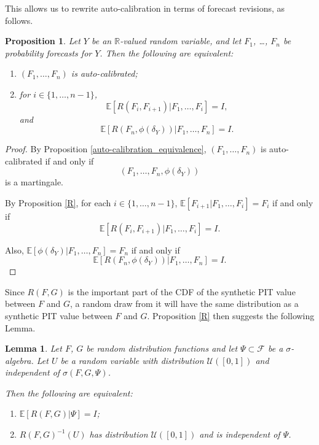 \documentclass[aap]{imsart}
\theoremstyle{plain}
\newtheorem{proposition}[theorem]{Proposition}
\newtheorem{lemma}[theorem]{Lemma}
\theoremstyle{definition}
\begin{document}
This allows us to rewrite auto-calibration in terms of forecast revisions, as follows.
\begin{proposition}\label{auto-calibrated_revisions}
  Let $Y$ be an $\mathbb{R}$-valued random variable, and let $F_1$, \ldots, $F_n$ be probability forecasts for $Y$. Then the following are equivalent:
\begin{enumerate}[label=(\roman*)]
\item $(F_1, \ldots, F_n)$ is auto-calibrated;
\item for $i \in \{1, \ldots, n-1\}$, 
\begin{equation*}
\mathbb{E}[R(F_i, F_{i+1})|F_1, \ldots, F_i] = I,
\end{equation*}
and 
\begin{equation*}
\mathbb{E}[R(F_n, \phi(\delta_Y))|F_1, \ldots, F_n] = I.
\end{equation*}
\end{enumerate}
\end{proposition}

\begin{proof}
  By Proposition \ref{auto-calibration_equivalence}, $(F_1, \ldots, F_n)$ is auto-calibrated if and only if
\begin{equation*}
  (F_1, \ldots, F_n, \phi(\delta_Y))
\end{equation*}
is a martingale.

  By Proposition \ref{R}, for each $i \in \{1, \ldots, n-1\}$, $\mathbb{E}[F_{i+1}|F_1, \ldots, F_i] = F_i$ if and only if \begin{equation*}
\mathbb{E}[R(F_i, F_{i+1})|F_1, \ldots, F_i] = I.
\end{equation*}

  Also, $\mathbb{E}[\phi(\delta_Y)|F_1, \ldots, F_n] = F_n$ if and only if
\begin{equation*}
\mathbb{E}[R(F_n, \phi(\delta_Y))|F_1, \ldots, F_n] = I.
\end{equation*}
\end{proof}

Since $R(F, G)$ is the important part of the CDF of the synthetic PIT value between $F$ and $G$, a random draw from it will have the same distribution as a synthetic PIT value between $F$ and $G$. Proposition \ref{R} then suggests the following Lemma.

\begin{lemma}
  Let $F$, $G$ be random distribution functions and let $\Psi \subset \mathcal{F}$ be a $\sigma$-algebra. Let $U$ be a random variable with distribution $\mathcal{U}([0,1])$ and independent of $\sigma(F, G, \Psi)$.

  Then the following are equivalent:
\begin{enumerate}[label=(\roman*)]
  \item $\mathbb{E}[R(F, G)|\Psi] = I$;
  \item $R(F, G)^{-1}(U)$ has distribution $\mathcal{U}([0,1])$ and is independent of $\Psi$.
\end{enumerate}
\end{lemma}
\end{document}
